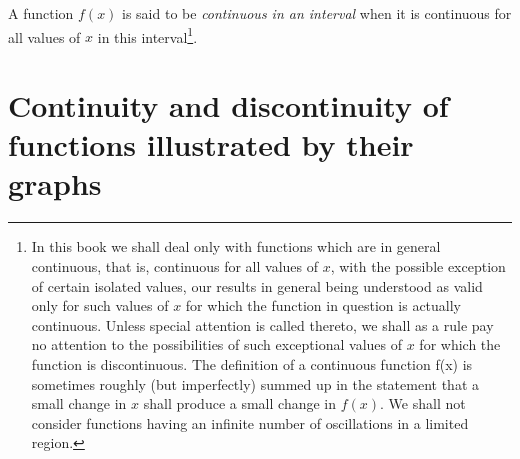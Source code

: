 A function $f(x)$ is said to be {\it continuous in an interval} when 
it is continuous for all values of $x$ in this interval\footnote{In 
this book we shall deal only with functions which are in general 
continuous, that is, continuous for all values of $x$, with the 
possible exception of certain isolated values, our results in 
general being understood as valid only for such values of $x$ 
for which the function in question is actually continuous. 
Unless special attention is called thereto, we shall as a rule 
pay no attention to the possibilities of such exceptional values 
of $x$ for which the function is discontinuous. The definition 
of a continuous function f(x) is sometimes roughly (but imperfectly) 
summed up in the statement that a small change in $x$ shall produce 
a small change in $f(x)$. We shall not consider functions having 
an infinite number of oscillations in a limited region.}.

\section{Continuity and discontinuity of functions illustrated by their graphs}
\label{sec:19}


